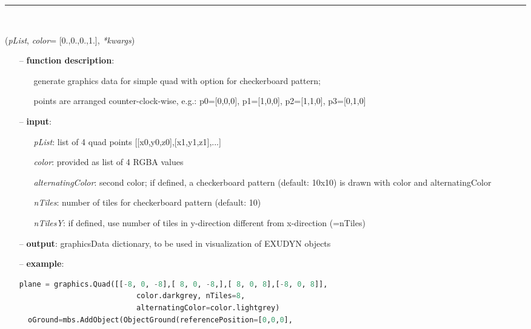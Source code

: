 \begin{itemize}[leftmargin=1.4cm]
\begin{itemize}[leftmargin=1.4cm]
\begin{itemize}[leftmargin=1.4cm]
\begin{itemize}[leftmargin=0.5cm]
\begin{itemize}[leftmargin=1.4cm]
\begin{itemize}[leftmargin=1.4cm]
\begin{itemize}[leftmargin=0.5cm]
\begin{itemize}[leftmargin=1.4cm]
%
\noindent\rule{8cm}{0.75pt}\vspace{1pt} \\ 
\begin{flushleft}
\label{sec:graphics:Quad}
({\it pList}, {\it color}= [0.,0.,0.,1.], {\it **kwargs})
\end{flushleft}
\setlength{\itemindent}{0.7cm}
\begin{itemize}[leftmargin=0.7cm]
\item[--]
{\bf function description}: \vspace{-6pt}
\begin{itemize}[leftmargin=1.2cm]
\setlength{\itemindent}{-0.7cm}
\item[]generate graphics data for simple quad with option for checkerboard pattern;
\item[]points are arranged counter-clock-wise, e.g.: p0=[0,0,0], p1=[1,0,0], p2=[1,1,0], p3=[0,1,0]
\end{itemize}
\item[--]
{\bf input}: \vspace{-6pt}
\begin{itemize}[leftmargin=1.2cm]
\setlength{\itemindent}{-0.7cm}
\item[]{\it pList}: list of 4 quad points [[x0,y0,z0],[x1,y1,z1],...]
\item[]{\it color}: provided as list of 4 RGBA values
\item[]{\it alternatingColor}: second color; if defined, a checkerboard pattern (default: 10x10) is drawn with color and alternatingColor
\item[]{\it nTiles}: number of tiles for checkerboard pattern (default: 10)
\item[]{\it nTilesY}: if defined, use number of tiles in y-direction different from x-direction (=nTiles)
\end{itemize}
\item[--]
{\bf output}: graphicsData dictionary, to be used in visualization of EXUDYN objects
\item[--]
{\bf example}: \vspace{-12pt}\ei\begin{lstlisting}[language=Python, xleftmargin=36pt]
  plane = graphics.Quad([[-8, 0, -8],[ 8, 0, -8,],[ 8, 0, 8],[-8, 0, 8]],
                           color.darkgrey, nTiles=8,
                           alternatingColor=color.lightgrey)
  oGround=mbs.AddObject(ObjectGround(referencePosition=[0,0,0],

\end{lstlisting}
\end{itemize}
\end{itemize}
\end{itemize}
\end{itemize}
\end{itemize}
\end{itemize}
\end{itemize}
\end{itemize}
\end{itemize}
